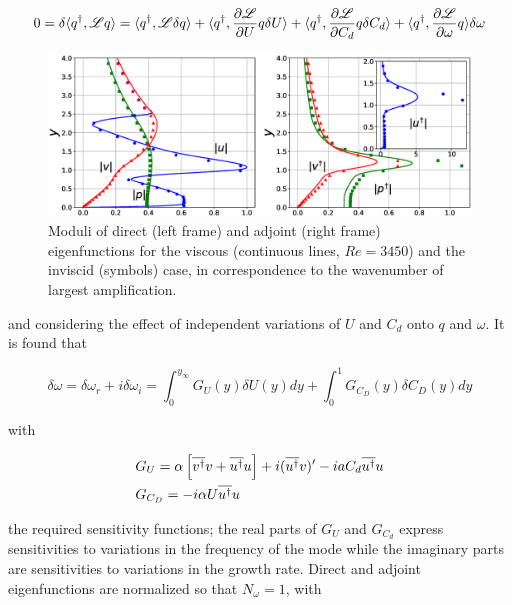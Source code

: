 \begin{equation}
0 = \delta \langle q^{\dagger}, \mathscr{L} q \rangle = 
\langle q^{\dagger}, \mathscr{L} \delta q \rangle +
\langle q^{\dagger}, \dfrac{\partial \mathscr{L}}{\partial U}  q \delta U\rangle +
\langle q^{\dagger}, \dfrac{\partial \mathscr{L}}{\partial C_d}  q \delta C_d\rangle +
\langle q^{\dagger}, \dfrac{\partial \mathscr{L}}{\partial \omega}  q \rangle \delta \omega
\label{eq:lagid}
\end{equation}

\begin{figure}[H]
	\centering
	\includegraphics[width=1\linewidth]{chapter_3/figure/3}
	\caption{Moduli of direct (left frame) and adjoint (right frame) eigenfunctions for the viscous (continuous lines, $Re = 3450$)
		and the inviscid (symbols) case, in correspondence to the wavenumber of largest amplification.}
	\label{fig:3}
\end{figure}

and considering the effect of independent variations of $U$ and $C_d$ onto $q$ and $\omega$. It is found that

\begin{equation}
\delta \omega =\delta \omega_r + i \delta \omega_i= \int_0^{y_{\infty}}  G_U(y) \delta U(y) dy + \int_0^{1}  G_{C_D}(y) \delta C_D(y) dy
\label{eq:s_omega}
\end{equation}

with

\begin{equation}
\begin{split}
&G_{U} =  \alpha \left[ \overline{v^{\dagger}} v + \overline{u^{\dagger}} u  \right] +i   (\overline{u^{\dagger}}   v)' -i a C_d \overline{u^{\dagger}}  u \vspace{0.3cm}\\
&G_{C_D} =  - i \alpha  U  \overline{u^{\dagger}} u
\label{eq:GCD}
\end{split}
\end{equation}

the required sensitivity functions; the real parts of $G_U$ and $G_{C_d}$ express sensitivities to variations in
the frequency of the mode while the imaginary parts are sensitivities to variations in the growth rate.
Direct and adjoint eigenfunctions are normalized so that $N_{\omega} = 1$, with

